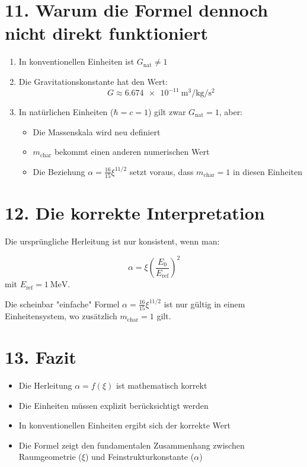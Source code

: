 \documentclass[12pt, a4paper]{article}
\begin{document}
	\section*{11. Warum die Formel dennoch nicht direkt funktioniert}
	
	\begin{enumerate}
		\item In konventionellen Einheiten ist $G_{\text{nat}} \neq 1$
		\item Die Gravitationskonstante hat den Wert:
		\[
		G \approx \SI{6.674e-11}{\cubic\meter\per\kg\per\square\second}
		\]
		\item In natürlichen Einheiten ($\hbar = c = 1$) gilt zwar $G_{\text{nat}} = 1$, aber:
		\begin{itemize}
			\item Die Massenskala wird neu definiert
			\item $m_{\text{char}}$ bekommt einen anderen numerischen Wert
			\item Die Beziehung $\alpha = \frac{16}{15} \xi^{11/2}$ setzt voraus, dass $m_{\text{char}} = 1$ in diesen Einheiten
		\end{itemize}
	\end{enumerate}
	
	\section*{12. Die korrekte Interpretation}
	
	Die ursprüngliche Herleitung ist nur konsistent, wenn man:
	
	\[
	\boxed{\alpha = \xi \left(\frac{E_0}{E_{\text{ref}}}\right)^2}
	\]
	mit $E_{\text{ref}} = \SI{1}{\MeV}$.
	
	Die scheinbar "einfache" Formel $\alpha = \frac{16}{15} \xi^{11/2}$ ist nur gültig in einem Einheitensystem, wo zusätzlich $m_{\text{char}} = 1$ gilt.
	
	\section*{13. Fazit}
	
	\begin{itemize}
		\item Die Herleitung $\alpha = f(\xi)$ ist mathematisch korrekt
		\item Die Einheiten müssen explizit berücksichtigt werden
		\item In konventionellen Einheiten ergibt sich der korrekte Wert
		\item Die Formel zeigt den fundamentalen Zusammenhang zwischen Raumgeometrie ($\xi$) und Feinstrukturkonstante ($\alpha$)
	\end{itemize}
\end{document}
